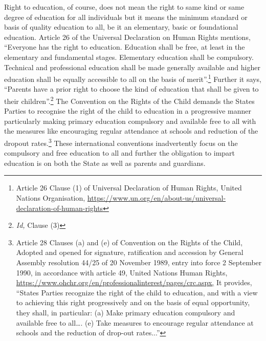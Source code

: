 \begin{multicols}{2}
\noi
Right to education, of course, does not mean the right to same kind or same degree of
education for all individuals but it means the minimum standard or basis of quality education
to all, be it an elementary, basic or foundational education. Article 26 of the Universal
Declaration on Human Rights mentions, “Everyone has the right to education. Education
shall be free, at least in the elementary and fundamental stages. Elementary education shall be
compulsory. Technical and professional education shall be made generally available and
higher education shall be equally accessible to all on the basis of merit”.\footnote{Article 26 Clause (1) of Universal Declaration of Human Rights, United Nations Organisation, \url{https://www.un.org/en/about-us/universal-declaration-of-human-rights}} Further it says, “Parents have a prior right to choose the kind of education that shall be given to their
children”.\footnote{\textit{Id,} Clause (3)} The Convention on the Rights of the Child demands the States Parties to
recognise the right of the child to education in a progressive manner particularly making
primary education compulsory and available free to all with the measures like encouraging
regular attendance at schools and reduction of the dropout rates.\footnote{Article 28 Clauses (a) and (e) of Convention on the Rights of the Child, Adopted and opened for signature, ratification and accession by General Assembly resolution 44/25 of 20 November 1989, entry into force 2 September 1990, in accordance with article 49, United Nations Human Rights, \url{https://www.ohchr.org/en/professionalinterest/pages/crc.aspx,} It provides, “States Parties recognize the right of the child to education, and with a view to achieving this right progressively and on the basis of equal
opportunity, they shall, in particular: (a) Make primary education compulsory and available free to all…. (e)
Take measures to encourage regular attendance at schools and the reduction of drop-out rates...”} These international
conventions inadvertently focus on the compulsory and free education to all and further the
obligation to impart education is on both the State as well as parents and guardians.


\end{multicols}
